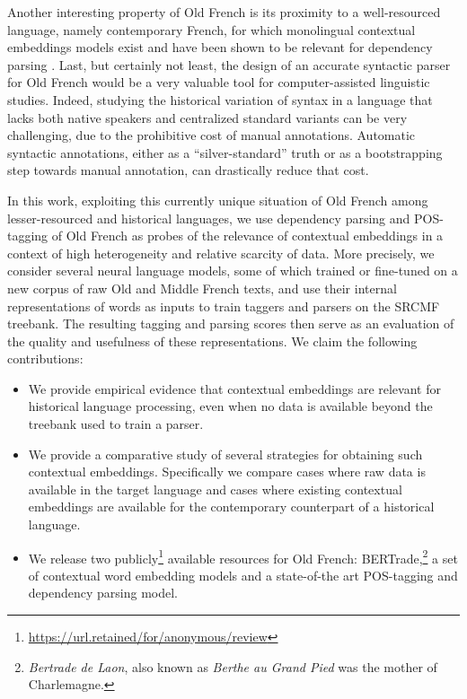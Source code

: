 Another interesting property of Old French is its proximity to a well-resourced language, namely contemporary French, for which monolingual contextual embeddings models exist and have been shown to be relevant for dependency parsing  \citep{le-etal-2020-flaubert,martin-etal-2020-camembert}.
Last, but certainly not least, the design of an accurate syntactic parser for Old French would be a very valuable tool for computer-assisted linguistic studies.
Indeed, studying the historical variation of syntax in a language that lacks both native speakers and centralized standard variants can be very challenging, due to the prohibitive cost of manual annotations. Automatic syntactic annotations, either as a \enquote{silver-standard} truth or as a bootstrapping step towards manual annotation, can drastically reduce that cost.

In this work, exploiting this currently unique situation of Old French among lesser-resourced and historical languages, we use dependency parsing and POS-tagging of Old French as probes of the relevance of contextual embeddings in a context of high heterogeneity and relative scarcity of data.
More precisely, we consider several neural language models, some of which trained or fine-tuned on a new corpus of raw Old and Middle French texts, and use their internal representations of words as inputs to train taggers and parsers on the SRCMF treebank. The resulting tagging and parsing scores then serve as an evaluation of the quality and usefulness of these representations.
We claim the following contributions:
%
\begin{itemize}
    \item We provide empirical evidence that contextual embeddings are relevant for historical language processing, even when no data is available beyond the treebank used to train a parser.
    \item We provide a comparative study of several strategies for obtaining such contextual embeddings. Specifically we compare cases where raw data is available in the target language and cases where existing contextual embeddings are available for the contemporary counterpart of a historical language.
    \item We release two publicly\footnote{\url{https://url.retained/for/anonymous/review}} available resources for Old French: BERTrade,\footnote{\emph{Bertrade de Laon}, also known as \emph{Berthe au Grand Pied} was the mother of Charlemagne.} a set of contextual word embedding models and a state-of-the art POS-tagging and dependency parsing model.
\end{itemize}

